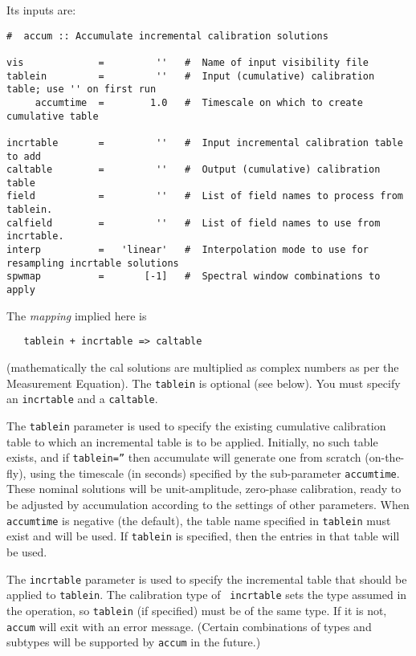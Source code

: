 Its inputs are:
\small
\begin{verbatim}
#  accum :: Accumulate incremental calibration solutions

vis             =         ''   #  Name of input visibility file
tablein         =         ''   #  Input (cumulative) calibration table; use '' on first run
     accumtime  =        1.0   #  Timescale on which to create cumulative table

incrtable       =         ''   #  Input incremental calibration table to add
caltable        =         ''   #  Output (cumulative) calibration table
field           =         ''   #  List of field names to process from tablein.
calfield        =         ''   #  List of field names to use from incrtable.
interp          =   'linear'   #  Interpolation mode to use for resampling incrtable solutions
spwmap          =       [-1]   #  Spectral window combinations to apply
\end{verbatim}
\normalsize
The {\it mapping} implied here is 
\small
\begin{verbatim}
   tablein + incrtable => caltable
\end{verbatim}
\normalsize
(mathematically the cal solutions are multiplied as complex numbers
as per the Measurement Equation).
The {\tt tablein} is optional (see below).
You must specify an {\tt incrtable} and a {\tt caltable}.

The {\tt tablein} parameter is used to specify the existing cumulative
calibration table to which an incremental table is to be applied.
Initially, no such table exists, and if {\tt tablein=''} then
accumulate will generate one from
scratch (on-the-fly), using the timescale (in seconds) specified by
the sub-parameter {\tt accumtime}. These nominal solutions will be
unit-amplitude, zero-phase calibration, ready to
be adjusted by accumulation according to the settings of other
parameters.  When {\tt accumtime} is negative (the default), the table
name specified in {\tt tablein} must exist and will be used.  If 
{\tt tablein} is specified, then the entries in that
table will be used.

The {\tt incrtable} parameter is used to specify the incremental table
that should be applied to {\tt tablein}. The calibration type of {\tt
incrtable} sets the type assumed in the operation, so {\tt tablein}
(if specified) must be of the same type. If it is not, {\tt accum}
will exit with an error message. (Certain combinations of types and
subtypes will be supported by {\tt accum} in the future.)

